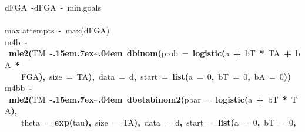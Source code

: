 \documentclass{article}
\makeatletter
\newcommand{\hlnumber}[1]{\textcolor[rgb]{0,0,0}{#1}}%
\newcommand{\hlfunctioncall}[1]{\textcolor[rgb]{.5,0,.33}{\textbf{#1}}}%
\newcommand{\hlkeyword}[1]{\textbf{#1}}%
\newcommand{\hlargument}[1]{\textcolor[rgb]{.69,.25,.02}{#1}}%
\newcommand{\hlcomment}[1]{\textcolor[rgb]{.18,.6,.34}{#1}}%
\newcommand{\hlassignement}[1]{\textbf{#1}}%
\newcommand{\hlsymbol}[1]{#1}%
\def\urltilda{\kern -.15em\lower .7ex\hbox{\~{}}\kern .04em}%
\newcommand{\hlstd}[1]{\textcolor[rgb]{0,0,0}{#1}}%
\newenvironment{kframe}{%
 \def\FrameCommand##1{\hskip\@totalleftmargin \hskip-\fboxsep
 \colorbox{shadecolor}{##1}\hskip-\fboxsep
     \hskip-\linewidth \hskip-\@totalleftmargin \hskip\columnwidth}%
 \MakeFramed {\advance\hsize-\width
   \@totalleftmargin\z@ \linewidth\hsize
   \@setminipage}}%
 {\par\unskip\endMakeFramed}
\newenvironment{knitrout}{}{} %
\makeatother
\begin{document}
\begin{knitrout}
{\begin{kframe}
\begin{flushleft}
\hlstd{}\hlcomment{\usebox{\hlnormalsizeboxhash}d\usebox{\hlnormalsizeboxdollar}FGA{\ }\usebox{\hlnormalsizeboxlessthan}-d\usebox{\hlnormalsizeboxdollar}FGA{\ }-{\ }min.goals}\hspace*{\fill}\\
\hlstd{}\hspace*{\fill}\\
\hlstd{}\hlcomment{\usebox{\hlnormalsizeboxhash}max.attempts{\ }\usebox{\hlnormalsizeboxlessthan}-{\ }max(d\usebox{\hlnormalsizeboxdollar}FGA)}\hspace*{\fill}\\
\hlstd{}\hlsymbol{m4b}{\ }\hlassignement{\usebox{\hlnormalsizeboxlessthan}-}{\ }\hlfunctioncall{mle2}\hlkeyword{(}\hlsymbol{TM}{\ }\hlkeyword{\urltilda{}}{\ }\hlfunctioncall{dbinom}\hlkeyword{(}\hlargument{prob}{\ }\hlargument{=}{\ }\hlfunctioncall{logistic}\hlkeyword{(}\hlsymbol{a}{\ }\hlkeyword{+}{\ }\hlsymbol{bT}{\ }\hlkeyword{*}{\ }\hlsymbol{TA}{\ }\hlkeyword{+}{\ }\hlsymbol{bA}{\ }\hlkeyword{*}\hspace*{\fill}\\
\hlstd{}{\ }{\ }{\ }{\ }\hlsymbol{FGA}\hlkeyword{)}\hlkeyword{,}{\ }\hlargument{size}{\ }\hlargument{=}{\ }\hlsymbol{TA}\hlkeyword{)}\hlkeyword{,}{\ }\hlargument{data}{\ }\hlargument{=}{\ }\hlsymbol{d}\hlkeyword{,}{\ }\hlargument{start}{\ }\hlargument{=}{\ }\hlfunctioncall{list}\hlkeyword{(}\hlargument{a}{\ }\hlargument{=}{\ }\hlnumber{0}\hlkeyword{,}{\ }\hlargument{bT}{\ }\hlargument{=}{\ }\hlnumber{0}\hlkeyword{,}{\ }\hlargument{bA}{\ }\hlargument{=}{\ }\hlnumber{0}\hlkeyword{)}\hlkeyword{)}\hspace*{\fill}\\
\hlstd{}\hlsymbol{m4bb}{\ }\hlassignement{\usebox{\hlnormalsizeboxlessthan}-}{\ }\hlfunctioncall{mle2}\hlkeyword{(}\hlsymbol{TM}{\ }\hlkeyword{\urltilda{}}{\ }\hlfunctioncall{dbetabinom2}\hlkeyword{(}\hlargument{pbar}{\ }\hlargument{=}{\ }\hlfunctioncall{logistic}\hlkeyword{(}\hlsymbol{a}{\ }\hlkeyword{+}{\ }\hlsymbol{bT}{\ }\hlkeyword{*}{\ }\hlsymbol{TA}\hlkeyword{)}\hlkeyword{,}\hspace*{\fill}\\
\hlstd{}{\ }{\ }{\ }{\ }\hlargument{theta}{\ }\hlargument{=}{\ }\hlfunctioncall{exp}\hlkeyword{(}\hlsymbol{tau}\hlkeyword{)}\hlkeyword{,}{\ }\hlargument{size}{\ }\hlargument{=}{\ }\hlsymbol{TA}\hlkeyword{)}\hlkeyword{,}{\ }\hlargument{data}{\ }\hlargument{=}{\ }\hlsymbol{d}\hlkeyword{,}{\ }\hlargument{start}{\ }\hlargument{=}{\ }\hlfunctioncall{list}\hlkeyword{(}\hlargument{a}{\ }\hlargument{=}{\ }\hlnumber{0}\hlkeyword{,}{\ }\hlargument{bT}{\ }\hlargument{=}{\ }\hlnumber{0}\hlkeyword{,}\hspace*{\fill}\\

\end{flushleft}
\end{kframe}}
\end{knitrout}
\end{document}
